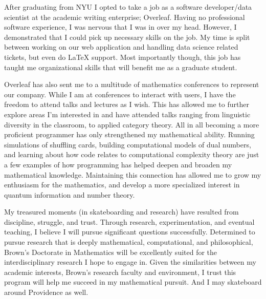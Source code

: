 \documentclass[11pt]{article}
\begin{document}
After graduating from NYU I opted to take a job as a software developer/data scientist at the academic writing enterprise; Overleaf. Having no professional software experience, I was nervous that I was in over my head. However, I demonstrated that I could pick up necessary skills on the job. My time is split between working on our web application and handling data science related tickets, but even do \LaTeX{} support. Most importantly though, this job has taught me organizational skills that will benefit me as a graduate student. 

Overleaf has also sent me to a multitude of mathematics conferences to represent our company. While I am at conferences to interact with users, I have the freedom to attend talks and lectures as I wish. This has allowed me to further explore areas I'm interested in and have attended talks ranging from linguistic diversity in the classroom, to applied category theory. All in all becoming a more proficient programmer has only strengthened my mathematical ability. Running simulations of shuffling cards, building computational models of dual numbers, and learning about how code relates to computational complexity theory are just a few examples of how programming has helped deepen and broaden my mathematical knowledge. Maintaining this connection has allowed me to grow my enthusiasm for the mathematics, and develop a more specialized interest in quantum information and number theory.

My treasured moments (in skateboarding and research) have resulted from discipline, struggle, and trust. Through research, experimentation, and eventual teaching, I believe I will pursue significant questions successfully. Determined to pursue research that is deeply mathematical, computational, and philosophical, Brown's Doctorate in Mathematics will be excellently suited for the interdisciplinary research I hope to engage in. Given the similarities between my academic interests, Brown’s research faculty and environment, I trust this program will help me succeed in my mathematical pursuit. And I may skateboard around Providence as well.
\end{document}
